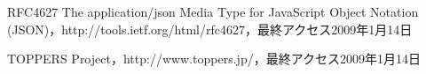 \begin{thebibliography}{99}
RFC4627 The application/json Media Type for JavaScript Object Notation (JSON)，http://tools.ietf.org/html/rfc4627，最終アクセス2009年1月14日

TOPPERS Project，http://www.toppers.jp/，最終アクセス2009年1月14日


\end{thebibliography}
